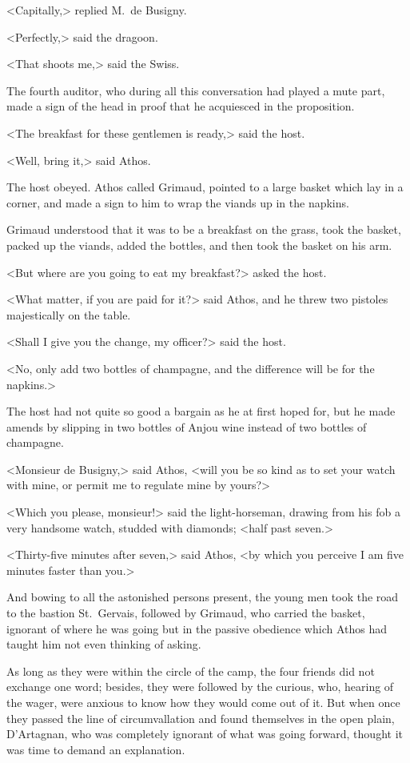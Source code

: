 <Capitally,> replied M.~de Busigny. 

<Perfectly,> said the dragoon. 

<That shoots me,> said the Swiss. 

The fourth auditor, who during all this conversation had played a mute part, made a sign of the head in proof that he acquiesced in the proposition. 

<The breakfast for these gentlemen is ready,> said the host. 

<Well, bring it,> said Athos. 

The host obeyed. Athos called Grimaud, pointed to a large basket which lay in a corner, and made a sign to him to wrap the viands up in the napkins. 

Grimaud understood that it was to be a breakfast on the grass, took the basket, packed up the viands, added the bottles, and then took the basket on his arm. 

<But where are you going to eat my breakfast?> asked the host. 

<What matter, if you are paid for it?> said Athos, and he threw two pistoles majestically on the table. 

<Shall I give you the change, my officer?> said the host. 

<No, only add two bottles of champagne, and the difference will be for the napkins.> 

The host had not quite so good a bargain as he at first hoped for, but he made amends by slipping in two bottles of Anjou wine instead of two bottles of champagne. 

<Monsieur de Busigny,> said Athos, <will you be so kind as to set your watch with mine, or permit me to regulate mine by yours?> 

<Which you please, monsieur!> said the light-horseman, drawing from his fob a very handsome watch, studded with diamonds; <half past seven.> 

<Thirty-five minutes after seven,> said Athos, <by which you perceive I am five minutes faster than you.> 

And bowing to all the astonished persons present, the young men took the road to the bastion St.~Gervais, followed by Grimaud, who carried the basket, ignorant of where he was going but in the passive obedience which Athos had taught him not even thinking of asking. 

As long as they were within the circle of the camp, the four friends did not exchange one word; besides, they were followed by the curious, who, hearing of the wager, were anxious to know how they would come out of it. But when once they passed the line of circumvallation and found themselves in the open plain, D'Artagnan, who was completely ignorant of what was going forward, thought it was time to demand an explanation. 

